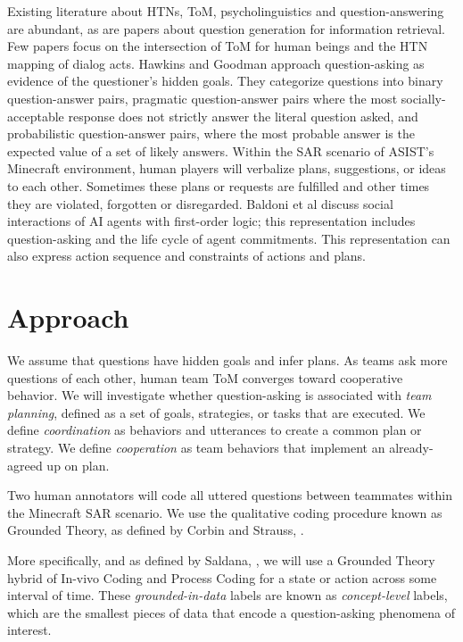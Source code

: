 Existing literature about HTNs, ToM, psycholinguistics and question-answering
are abundant, as are papers about question generation for information
retrieval. Few papers focus on the intersection of ToM for human beings and the HTN mapping of dialog acts. Hawkins and Goodman \citep{hawkins2017you} approach question-asking as evidence of the questioner’s hidden goals. They categorize questions into binary question-answer pairs, pragmatic question-answer pairs where the most socially-acceptable response does not strictly answer the literal question asked, and probabilistic question-answer pairs, where the most probable answer is the expected value of a set of likely answers. Within the SAR scenario of ASIST’s Minecraft environment, human players will
verbalize plans, suggestions, or ideas to each other. Sometimes these plans or
requests are fulfilled and other times they are violated, forgotten or
disregarded. Baldoni et al \citep{baldoni_2018} discuss social interactions
of AI agents with first-order logic; this representation includes
question-asking and the life cycle of agent commitments. This representation can also express action sequence and constraints of actions and plans.



\section{Approach}

We assume that questions have hidden goals and infer plans. As teams ask more questions of each other, human team ToM converges toward cooperative behavior.
We will investigate whether question-asking is associated with \textit{team
planning}, defined as a set of goals, strategies, or tasks that are executed.
We define \textit{coordination} as behaviors and utterances to create a common
plan or strategy. We define \textit{cooperation} as team behaviors that implement an already-agreed up on plan.

Two human annotators will code all uttered questions between teammates within the Minecraft SAR scenario.
We use the qualitative coding procedure known as Grounded Theory,
as defined by Corbin and Strauss, \citep{corbin_strass_2015}. 

More specifically, and as defined by Saldana, \citep{saldana_2015}, we will use a Grounded Theory hybrid of In-vivo Coding and Process Coding for a state or action across some interval of time. These \textit{grounded-in-data} labels are known as \textit{concept-level} labels, which are the smallest pieces of data that encode a question-asking phenomena of interest.

